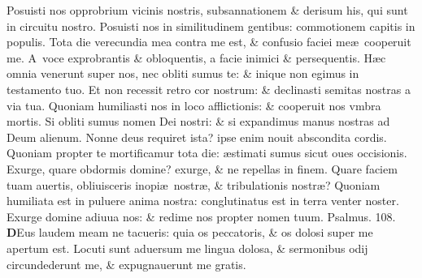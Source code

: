 \documentclass[a5paper,10pt]{book}
\def\ae{æ}
\begin{document}
\begin{multicols*}{2}
\newline \color{red} P\color{black}osuisti nos opprobrium vicinis nostris, subsannationem \& derisum his, qui sunt in circuitu nostro.
\newline \color{red} P\color{black}osuisti nos in similitudinem gentibus: commotionem capitis in populis.
\newline \color{red} T\color{black}ota die verecundia mea contra me est, \& confusio faciei me\ae \ cooperuit me.
\newline \color{red} A\color{black}\ voce exprobrantis \& obloquentis, a facie inimici \& persequentis.
\newline \color{red} H\color{black}\ae c omnia venerunt super nos, nec obliti sumus te: \& inique non egimus in testamento tuo.
\newline \color{red} E\color{black}t non recessit retro cor nostrum: \& declinasti semitas nostras a via tua.
\newline \color{red} Q\color{black}uoniam humiliasti nos in loco afflictionis: \& cooperuit nos vmbra mortis.
\newline \color{red} S\color{black}i obliti sumus nomen Dei nostri: \& si expandimus manus nostras ad Deum alienum.
\newline \color{red} N\color{black}onne deus requiret ista? ipse enim nouit abscondita cordis.
\newline \color{red} Q\color{black}uoniam propter te mortificamur tota die: \ae stimati sumus sicut oues occisionis.
\newline \color{red} E\color{black}xurge, quare obdormis domine? exurge, \& ne repellas in finem.
\newline \color{red} Q\color{black}uare faciem tuam auertis, obliuisceris inopi\ae \ nostr\ae , \& tribulationis nostr\ae ?
\newline \color{red} Q\color{black}uoniam humiliata est in puluere anima nostra: conglutinatus est in terra venter noster.
\newline \color{red} E\color{black}xurge domine adiuua nos: \& redime nos propter nomen tuum.
\newline \color{red} Psalmus. \hypertarget{ps108}{108.} \color{black}
\vspace{-1em}
\lettrine[lines=2]{\bfseries \color{red} D}{}Eus laudem meam ne tacueris: quia os peccatoris, \& os dolosi super me apertum est.
\newline \color{red} L\color{black}ocuti sunt aduersum me lingua dolosa, \& sermonibus odij circundederunt me, \& expugnauerunt me gratis.

\end{multicols*}
\end{document}
